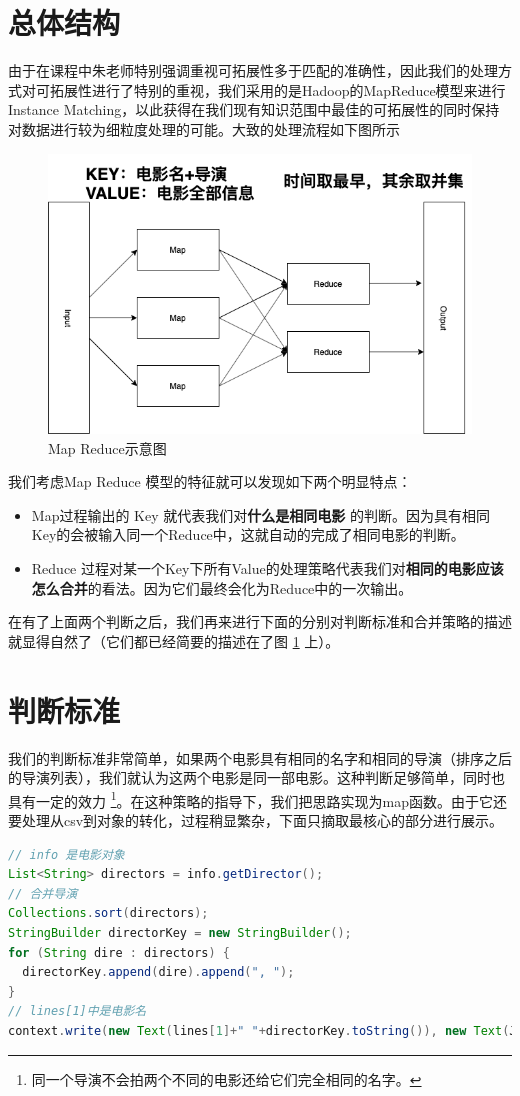 \documentclass{ctexrep}
\begin{document}
	\section{总体结构}
	由于在课程中朱老师特别强调重视可拓展性多于匹配的准确性，因此我们的处理方式对可拓展性进行了特别的重视，我们采用的是Hadoop的MapReduce模型来进行Instance Matching，以此获得在我们现有知识范围中最佳的可拓展性的同时保持对数据进行较为细粒度处理的可能。大致的处理流程如下图所示\begin{figure}[H]
		\centering
		\includegraphics[width=0.7\linewidth]{img/maprecude}
		\caption{Map Reduce示意图}
		\label{fig:maprecude}
	\end{figure}
	
	我们考虑Map Reduce 模型的特征就可以发现如下两个明显特点：\begin{itemize}
		\item Map过程输出的 Key 就代表我们对\textbf{什么是相同电影} 的判断。因为具有相同Key的会被输入同一个Reduce中，这就自动的完成了相同电影的判断。
		\item Reduce 过程对某一个Key下所有Value的处理策略代表我们对\textbf{相同的电影应该怎么合并}的看法。因为它们最终会化为Reduce中的一次输出。
	\end{itemize}
在有了上面两个判断之后，我们再来进行下面的分别对判断标准和合并策略的描述就显得自然了（它们都已经简要的描述在了图 \ref{fig:maprecude} 上）。
	\section{判断标准}
	我们的判断标准非常简单，如果两个电影具有相同的名字和相同的导演（排序之后的导演列表），我们就认为这两个电影是同一部电影。这种判断足够简单，同时也具有一定的效力 \footnote{同一个导演不会拍两个不同的电影还给它们完全相同的名字。}。在这种策略的指导下，我们把思路实现为map函数。由于它还要处理从csv到对象的转化，过程稍显繁杂，下面只摘取最核心的部分进行展示。\begin{lstlisting}[language=java]
// info 是电影对象
List<String> directors = info.getDirector();
// 合并导演
Collections.sort(directors);
StringBuilder directorKey = new StringBuilder();
for (String dire : directors) {
  directorKey.append(dire).append(", ");
}
// lines[1]中是电影名
context.write(new Text(lines[1]+" "+directorKey.toString()), new Text(JSON.toJSONString(info)));
	\end{lstlisting}
\end{document}
